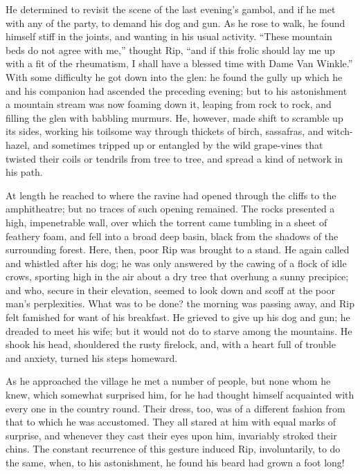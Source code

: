 He determined to revisit the scene of the last evening’s gambol, and if he met with any of the party, to demand his dog and gun. As he rose to walk, he found himself stiff in the joints, and wanting in his usual activity. “These mountain beds do not agree with me,” thought Rip, “and if this frolic should lay me up with a fit of the rheumatism, I shall have a blessed time with Dame Van Winkle.” With some difficulty he got down into the glen: he found the gully up which he and his companion had ascended the preceding evening; but to his astonishment a mountain stream was now foaming down it, leaping from rock to rock, and filling the glen with babbling murmurs. He, however, made shift to scramble up its sides, working his toilsome way through thickets of birch, sassafras, and witch-hazel, and sometimes tripped up or entangled by the wild grape-vines that twisted their coils or tendrils from tree to tree, and spread a kind of network in his path.

At length he reached to where the ravine had opened through the cliffs to the amphitheatre; but no traces of such opening remained. The rocks presented a high, impenetrable wall, over which the torrent came tumbling in a sheet of feathery foam, and fell into a broad deep basin, black from the shadows of the surrounding forest. Here, then, poor Rip was brought to a stand. He again called and whistled after his dog; he was only answered by the cawing of a flock of idle crows, sporting high in the air about a dry tree that overhung a sunny precipice; and who, secure in their elevation, seemed to look down and scoff at the poor man’s perplexities. What was to be done? the morning was passing away, and Rip felt famished for want of his breakfast. He grieved to give up his dog and gun; he dreaded to meet his wife; but it would not do to starve among the mountains. He shook his head, shouldered the rusty firelock, and, with a heart full of trouble and anxiety, turned his steps homeward.

As he approached the village he met a number of people, but none whom he knew, which somewhat surprised him, for he had thought himself acquainted with every one in the country round. Their dress, too, was of a different fashion from that to which he was accustomed. They all stared at him with equal marks of surprise, and whenever they cast their eyes upon him, invariably stroked their chins. The constant recurrence of this gesture induced Rip, involuntarily, to do the same, when, to his astonishment, he found his beard had grown a foot long!

